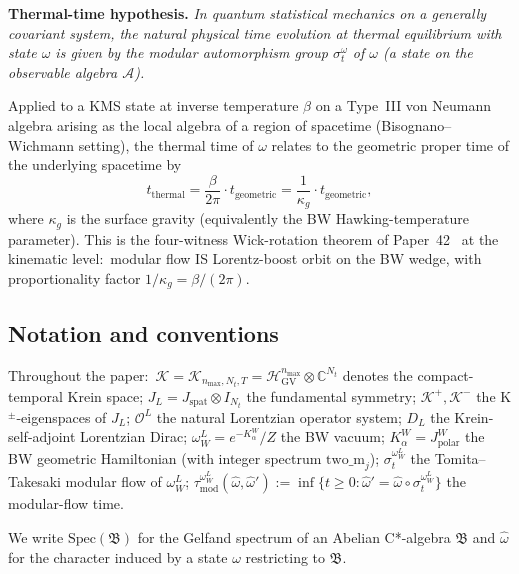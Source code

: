 \documentclass[11pt,a4paper]{article}
\theoremstyle{plain}
\theoremstyle{definition}
\newcommand{\nmax}{n_{\max}}
\newcommand{\Nt}{N_{t}}
\newcommand{\Krein}{\mathcal{K}}
\newcommand{\Op}{\mathcal{O}}
\newcommand{\Acal}{\mathcal{A}}
\newcommand{\C}{\mathbb{C}}
\newcommand{\DL}{D_{L}}
\newcommand{\JL}{J_{L}}
\newcommand{\HGV}{\mathcal{H}_{\mathrm{GV}}}
\newcommand{\Kplus}{\Krein^{+}}
\newcommand{\Kminus}{\Krein^{-}}
\newcommand{\spat}{\mathrm{spat}}
\newcommand{\BWvac}{\omega_{W}^{L}}
\newcommand{\Kalpha}{K_{\alpha}^{W}}
\newcommand{\tmod}{\tau_{\mathrm{mod}}}
\newcommand{\kappag}{\kappa_{g}}
\begin{document}
\medskip

\noindent\textbf{Thermal-time hypothesis.} \emph{In quantum
statistical mechanics on a generally covariant system, the natural
physical time evolution at thermal equilibrium with state $\omega$ is
given by the modular automorphism group $\sigma_{t}^{\omega}$ of
$\omega$ (a state on the observable algebra $\Acal$).}

\medskip

Applied to a KMS state at inverse temperature $\beta$ on a Type~III
von Neumann algebra arising as the local algebra of a region of
spacetime (Bisognano--Wichmann setting), the thermal time of $\omega$
relates to the geometric proper time of the underlying spacetime by
\begin{equation}\label{eq:connes_rovelli_identification}
t_{\mathrm{thermal}} = \frac{\beta}{2\pi} \cdot t_{\mathrm{geometric}}
= \frac{1}{\kappag} \cdot t_{\mathrm{geometric}},
\end{equation}
where $\kappag$ is the surface gravity (equivalently the BW
Hawking-temperature parameter). This is the four-witness
Wick-rotation theorem of Paper~42~\cite{paper42} at the kinematic
level:\ modular flow IS Lorentz-boost orbit on the BW wedge, with
proportionality factor $1/\kappag = \beta/(2\pi)$.

\subsection{Notation and conventions}\label{sec:notation}

Throughout the paper:\
$\Krein = \Krein_{\nmax, \Nt, T} = \HGV^{\nmax} \otimes \C^{\Nt}$
denotes the compact-temporal Krein space;
$\JL = J_{\spat} \otimes I_{\Nt}$ the fundamental symmetry;
$\Kplus, \Kminus$ the K$^{\pm}$-eigenspaces of $\JL$;
$\Op^{L}$ the natural Lorentzian operator system;
$\DL$ the Krein-self-adjoint Lorentzian Dirac;
$\BWvac = e^{-\Kalpha}/Z$ the BW vacuum;
$\Kalpha = J_{\mathrm{polar}}^{W}$ the BW geometric Hamiltonian (with
integer spectrum $\mathrm{two\_m}_{j}$);
$\sigma_{t}^{\BWvac}$ the Tomita--Takesaki modular flow of $\BWvac$;
$\tmod^{\BWvac}(\hat{\omega}, \hat{\omega}') := \inf\{t \ge 0 :
\hat{\omega}' = \hat{\omega} \circ \sigma_{t}^{\BWvac}\}$ the
modular-flow time.

We write $\mathrm{Spec}(\mathfrak{B})$ for the Gelfand spectrum of an
Abelian C*-algebra $\mathfrak{B}$ and $\hat{\omega}$ for the character
induced by a state $\omega$ restricting to $\mathfrak{B}$.

\end{document}
